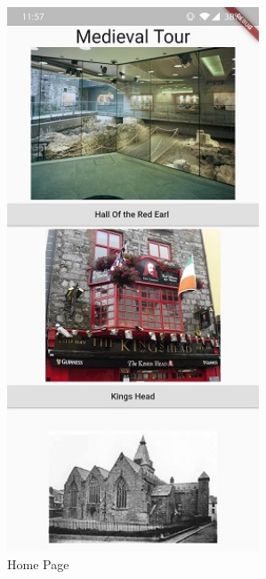 \begin{figure}[ht!]
    \centering
 \includegraphics[width=75mm,height=162mm]{img/homeshot.jpg}
\caption{Home Page}
\label{fig:Home page of mobile application}
\end{figure}

